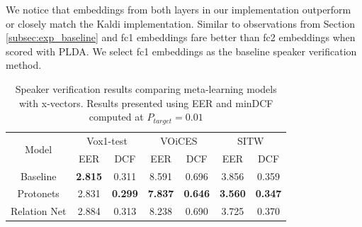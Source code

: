 We notice that embeddings from both layers in our implementation outperform or closely match the Kaldi implementation. Similar to observations from Section \ref{subsec:exp_baseline} and \cite{snyder_xvec2017} fc1 embeddings fare better than fc2 embeddings when scored with PLDA. We select fc1 embeddings as the baseline speaker verification method.


\begin{table}[h]
\caption{Speaker verification results comparing meta-learning models with x-vectors. Results presented using EER and minDCF computed at $P_{target} = 0.01$ }
\label{tab:spkrVerCore}
\begin{tabular}{ccccccc} \\ \hline
\multirow{2}{*}{Model} & \multicolumn{2}{c}{Vox1-test} & \multicolumn{2}{c}{VOiCES} & \multicolumn{2}{c}{SITW} \\
 & EER & DCF & EER & DCF & EER & DCF  \\ \hline
\rule{0pt}{3ex} Baseline & \textbf{2.815} & 0.311 & 8.591 & 0.696 & 3.856 & 0.359 \\
\rule{0pt}{3ex} Protonets & 2.831 & \textbf{0.299} & \textbf{7.837} & \textbf{0.646} & \textbf{3.560} & \textbf{0.347} \\ 
\rule{0pt}{3ex} Relation Net & 2.884 & 0.313 & 8.238 & 0.690 & 3.725 & 0.370 \\ \hline
\end{tabular}
\end{table}

